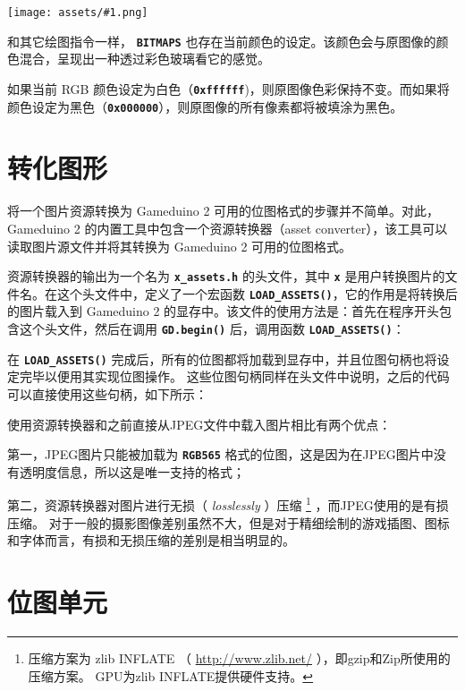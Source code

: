 \documentclass[10pt]{book}
\newcommand{\gdtwo}{Gameduino 2 }
\newcommand{\png}[1]{
\begin{center}
\texttt{[image: assets/\#1.png]}
\end{center}
}
\newcommand{\mach}[1]{\texttt{\textbf{#1}}}
\begin{document}
\begin{CJK}{UTF8}{gkai}
\png{0011}

和其它绘图指令一样， \mach{BITMAPS} 也存在当前颜色的设定。该颜色会与原图像的颜色混合，呈现出一种透过彩色玻璃看它的感觉。


如果当前 RGB 颜色设定为白色（\mach{0xffffff})，则原图像色彩保持不变。而如果将颜色设定为黑色（\mach{0x000000}），则原图像的所有像素都将被填涂为黑色。
\clearpage

\newpage
\section{转化图形}
\label{assets}

将一个图片资源转换为 \gdtwo 可用的位图格式的步骤并不简单。对此， \gdtwo 的内置工具中包含一个资源转换器（asset converter），该工具可以读取图片源文件并将其转换为 \gdtwo 可用的位图格式。


资源转换器的输出为一个名为 \mach{x\_assets.h} 的头文件，其中 \mach{x} 是用户转换图片的文件名。在这个头文件中，定义了一个宏函数 \mach{LOAD\_ASSETS()}，它的作用是将转换后的图片载入到 \gdtwo 的显存中。该文件的使用方法是：首先在程序开头包含这个头文件，然后在调用 \mach{GD.begin()} 后，调用函数 \mach{LOAD\_ASSETS()}：


在 \mach{LOAD\_ASSETS()} 完成后，所有的位图都将加载到显存中，并且位图句柄也将设定完毕以便用其实现位图操作。
这些位图句柄同样在头文件中说明，之后的代码可以直接使用这些句柄，如下所示：


使用资源转换器和之前直接从JPEG文件中载入图片相比有两个优点：

第一，JPEG图片只能被加载为 \mach{RGB565} 格式的位图，这是因为在JPEG图片中没有透明度信息，所以这是唯一支持的格式；

第二，资源转换器对图片进行无损（ \textit{losslessly} ）压缩 \footnote{
压缩方案为 zlib INFLATE
（ \url{http://www.zlib.net/} ），即gzip和Zip所使用的压缩方案。
GPU为zlib INFLATE提供硬件支持。} ，而JPEG使用的是有损压缩。
对于一般的摄影图像差别虽然不大，但是对于精细绘制的游戏插图、图标和字体而言，有损和无损压缩的差别是相当明显的。

\newpage
\section{位图单元}


\end{CJK}
\end{document}

